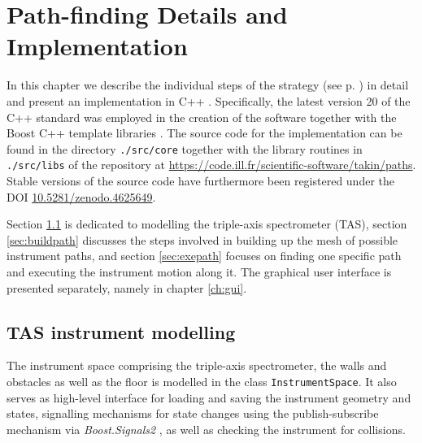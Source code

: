 %
%

\chapter{Path-finding Details and Implementation}
\label{ch:impl}

In this chapter we describe the individual steps of the strategy (see p. \pageref{sec:strategy}) in detail
and present an implementation in C++ \cite{Stroustrup2008, Stroustrup2018}. Specifically,
the latest version 20 of the C++ standard \cite{ISOCPP20} was employed in the creation of the software
together with the Boost C++ template libraries \cite{web_boost}. The source code for the implementation
can be found in the directory \lstinline|./src/core| together with the library routines in \lstinline|./src/libs|
of the repository at \url{https://code.ill.fr/scientific-software/takin/paths}. Stable versions of the
source code have furthermore been registered under the DOI \href{https://doi.org/10.5281/zenodo.4625649}{10.5281/zenodo.4625649}.

Section \ref{sec:tasmodel} is dedicated to modelling the triple-axis spectrometer (TAS), 
section \ref{sec:buildpath} discusses the steps involved in building up the mesh of possible instrument paths, 
and section \ref{sec:exepath} focuses on finding one specific path and executing the instrument motion along it.
The graphical user interface is presented separately, namely in chapter \ref{ch:gui}.





\section{TAS instrument modelling}
\label{sec:tasmodel}

The instrument space comprising the triple-axis spectrometer, the walls and obstacles as well as the floor is modelled in
the class \lstinline[language=C++]|InstrumentSpace|. It also serves as high-level interface for loading and saving
the instrument geometry and states, signalling mechanisms for state changes using the publish-subscribe mechanism
via \textit{Boost.Signals2} \cite{web_boost_signals}, as well as checking the instrument for collisions.


